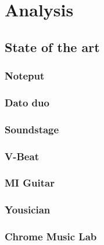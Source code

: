\chapter{Analysis}


\section{State of the art}
	\subsection{Noteput}
		
	\subsection{Dato duo}
		
	\subsection{Soundstage}
		
	\subsection{V-Beat}
		
	\subsection{MI Guitar}
	
	\subsection{Yousician}
	
	\subsection{Chrome Music Lab}
	
		